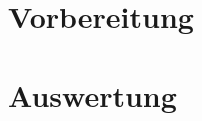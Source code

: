 \documentclass{article}
\begin{document}
%

\section{Vorbereitung}


%

%
\newpage
\section{Auswertung}


\end{document}
